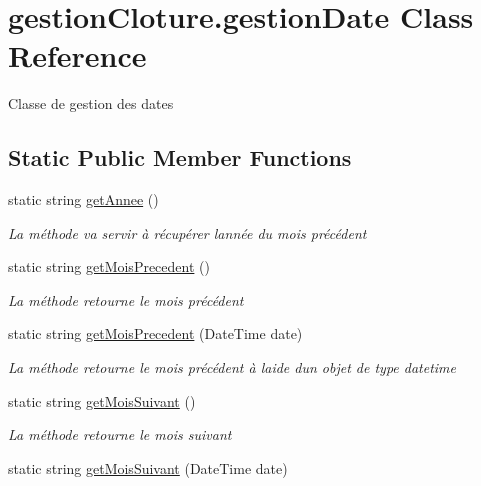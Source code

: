 \hypertarget{classgestion_cloture_1_1gestion_date}{}\section{gestion\+Cloture.\+gestion\+Date Class Reference}
\label{classgestion_cloture_1_1gestion_date}


Classe de gestion des dates  


\subsection*{Static Public Member Functions}
\begin{DoxyCompactItemize}
\item 
static string \mbox{\hyperlink{classgestion_cloture_1_1gestion_date_aad0e5e580f0f1e579b6dcfccb2968d67}{get\+Annee}} ()
\begin{DoxyCompactList}\small\item\em La méthode va servir à récupérer l\textquotesingle{}année du mois précédent \end{DoxyCompactList}\item 
static string \mbox{\hyperlink{classgestion_cloture_1_1gestion_date_a228ef4d679207b472d78741b3e965b99}{get\+Mois\+Precedent}} ()
\begin{DoxyCompactList}\small\item\em La méthode retourne le mois précédent \end{DoxyCompactList}\item 
static string \mbox{\hyperlink{classgestion_cloture_1_1gestion_date_a0cc7cfb2a7874100e6276188f229819f}{get\+Mois\+Precedent}} (Date\+Time date)
\begin{DoxyCompactList}\small\item\em La méthode retourne le mois précédent à l\textquotesingle{}aide d\textquotesingle{}un objet de type datetime \end{DoxyCompactList}\item 
static string \mbox{\hyperlink{classgestion_cloture_1_1gestion_date_aa30693cc45b10c009399d7a547f07dee}{get\+Mois\+Suivant}} ()
\begin{DoxyCompactList}\small\item\em La méthode retourne le mois suivant \end{DoxyCompactList}\item 
static string \mbox{\hyperlink{classgestion_cloture_1_1gestion_date_abb6535d1c83722cb363400786129d6da}{get\+Mois\+Suivant}} (Date\+Time date)

\end{DoxyCompactItemize}
